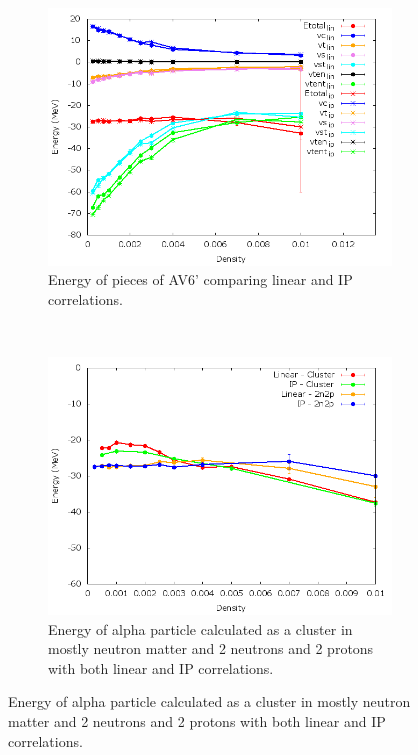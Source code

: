 \documentclass[12pt]{article}
\begin{document}
\begin{figure}[h!]
\begin{subfigure}{0.49\textwidth}
   \end{subfigure}
   ~
   \begin{subfigure}{0.49\textwidth}
      \includegraphics[width=\textwidth]{../av6_2n2p_linVSip.png}
      \caption{Energy of pieces of AV6' comparing linear and IP correlations.}
   \end{subfigure}
   ~
   \begin{subfigure}{0.49\textwidth}
      \includegraphics[width=\textwidth]{../alpha_and_2n2p.png}
      \caption{Energy of alpha particle calculated as a cluster in mostly neutron matter and 2 neutrons and 2 protons with both linear and IP correlations.}
   \end{subfigure}
\end{figure}


\clearpage


\end{document}
